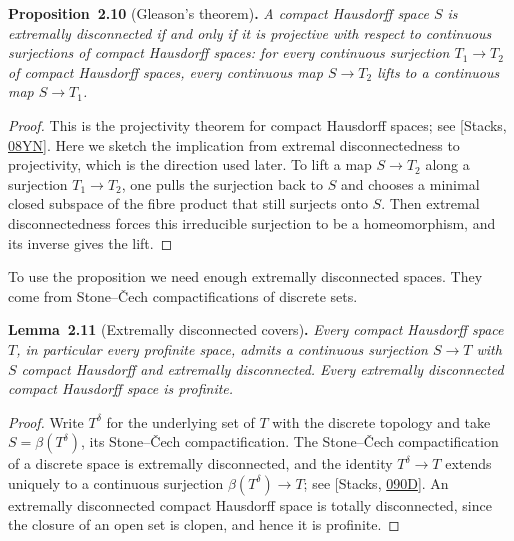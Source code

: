 \documentclass[11pt]{article}
\newenvironment{bpstatement}[2]{\par\addvspace{0.6\baselineskip}\noindent\textbf{#1}#2\textbf{.}\enspace\ignorespaces}
  {\par\addvspace{0.4\baselineskip}}
\newenvironment{bpstatementit}[2]{\begin{bpstatement}{#1}{#2}\itshape\ignorespaces}{\end{bpstatement}}
\begin{document}
\label{bp28}%
\begin{bpstatementit}{Proposition~2.10}{ (Gleason's theorem)}
A compact Hausdorff space \(S\) is extremally disconnected if and only if it is projective with respect to continuous surjections of compact Hausdorff spaces: for every continuous surjection \(T_1\to T_2\) of compact Hausdorff spaces, every continuous map \(S\to T_2\) lifts to a continuous map \(S\to T_1\).
\end{bpstatementit}

\begin{proof}[{Proof}]\label{bp29}%
This is the projectivity theorem for compact Hausdorff spaces; see [Stacks, \href{https://stacks.math.columbia.edu/tag/08YN}{08YN}]. Here we sketch the implication from extremal disconnectedness to projectivity, which is the direction used later. To lift a map \(S\to T_2\) along a surjection \(T_1\to T_2\), one pulls the surjection back to \(S\) and chooses a minimal closed subspace of the fibre product that still surjects onto \(S\). Then extremal disconnectedness forces this irreducible surjection to be a homeomorphism, and its inverse gives the lift.
\end{proof}

\label{bp30}%
To use the proposition we need enough extremally disconnected spaces. They come from Stone–Čech compactifications of discrete sets.

\label{bp31}%
\begin{bpstatementit}{Lemma~2.11}{ (Extremally disconnected covers)}
Every compact Hausdorff space \(T\), in particular every profinite space, admits a continuous surjection \(S\to T\) with \(S\) compact Hausdorff and extremally disconnected. Every extremally disconnected compact Hausdorff space is profinite.
\end{bpstatementit}

\begin{proof}[{Proof}]\label{bp32}%
Write \(T^{\delta}\) for the underlying set of \(T\) with the discrete topology and take \(S=\beta(T^{\delta})\), its Stone–Čech compactification. The Stone–Čech compactification of a discrete space is extremally disconnected, and the identity \(T^{\delta}\to T\) extends uniquely to a continuous surjection \(\beta(T^{\delta})\to T\); see [Stacks, \href{https://stacks.math.columbia.edu/tag/090D}{090D}]. An extremally disconnected compact Hausdorff space is totally disconnected, since the closure of an open set is clopen, and hence it is profinite.
\end{proof}
\end{document}
